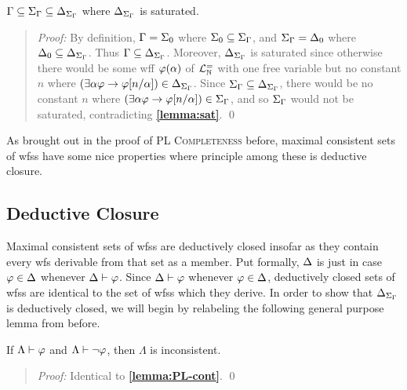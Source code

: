 \begin{Lthm} \label{lemma:include}
  $\Gamma\subseteq\Sigma_{\Gamma}\subseteq\Delta_{\Sigma_{\Gamma}}$ where $\Delta_{\Sigma_{\Gamma}}$ is saturated.
\end{Lthm}
 
\begin{quote} 
  \textit{Proof:} 
  By definition, $\Gamma=\Sigma_0$ where $\Sigma_0\subseteq\Sigma_{\Gamma}$, and $\Sigma_{\Gamma}=\Delta_0$ where $\Delta_0\subseteq\Delta_{\Sigma_{\Gamma}}$.
  Thus $\Gamma\subseteq\Delta_{\Sigma_{\Gamma}}$.
  Moreover, $\Delta_{\Sigma_{\Gamma}}$ is saturated since otherwise there would be some wff $\varphi(\alpha)$ of $\mathcal{L}^{=}_{\mathbb{N}}$ with one free variable but no constant $n$ where $(\exists \alpha\varphi \rightarrow \varphi[n/\alpha])\in\Delta_{\Sigma_{\Gamma}}$. 
  Since $\Sigma_{\Gamma}\subseteq\Delta_{\Sigma_{\Gamma}}$, there would be no constant $n$ where $(\exists \alpha\varphi \rightarrow \varphi[n/\alpha])\in\Sigma_{\Gamma}$, and so $\Sigma_{\Gamma}$ would not be saturated, contradicting \textbf{\ref{lemma:sat}}.
  \qed
\end{quote}

As brought out in the proof of \textsc{PL Completeness} before, maximal consistent sets of wfss have some nice properties where principle among these is deductive closure.



\subsection{Deductive Closure}%
  \label{sub:DeductiveClosure}

Maximal consistent sets of wfss are deductively closed insofar as they contain every wfs derivable from that set as a member.
Put formally, $\Delta$ is  just in case $\varphi\in\Delta$ whenever $\Delta\vdash\varphi$.
Since $\Delta\vdash\varphi$ whenever $\varphi\in\Delta$, deductively closed sets of wfss are identical to the set of wfss which they derive.
In order to show that $\Delta_{\Sigma_{\Gamma}}$ is deductively closed, we will begin by relabeling the following general purpose lemma from before. 

\begin{Lthm} \label{lemma:cont}
  If $\Lambda\vdash\varphi$ and $\Lambda\vdash\neg\varphi$, then $\Lambda$ is inconsistent. 
\end{Lthm}

\begin{quote} 
  \textit{Proof:} 
  Identical to \textbf{\ref{lemma:PL-cont}}.
  \qed
\end{quote}
  





